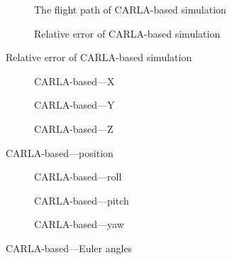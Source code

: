 \begin{figure}[H]
    \centering
    \begin{subfigure}{0.45\textwidth}
        
        \caption{The flight path of CARLA-based simulation}\label{fig:carla-path}
    \end{subfigure}
    \begin{subfigure}{0.45\textwidth}
        
        \caption{Relative error of CARLA-based simulation}\label{fig:carla-error}
    \end{subfigure}
\end{figure}

\begin{figure}[H]
    \centering
    \begin{subfigure}{0.3\textwidth}
        
        \caption{CARLA-based---X}
    \end{subfigure}
    \hfill
    \begin{subfigure}{0.3\textwidth}
        
        \caption{CARLA-based---Y}
    \end{subfigure}
    \hfill
    \begin{subfigure}{0.3\textwidth}
        
        \caption{CARLA-based---Z}
    \end{subfigure}
    \caption{CARLA-based---position}\label{fig:carla-pos}
\end{figure}

\begin{figure}[H]
    \centering
    \begin{subfigure}{0.3\textwidth}
        
        \caption{CARLA-based---roll}
    \end{subfigure}
    \hfill
    \begin{subfigure}{0.3\textwidth}
        
        \caption{CARLA-based---pitch}
    \end{subfigure}
    \hfill
    \begin{subfigure}{0.3\textwidth}
        
        \caption{CARLA-based---yaw}
    \end{subfigure}
    \caption{CARLA-based---Euler angles}\label{fig:carla-euler}
\end{figure}

